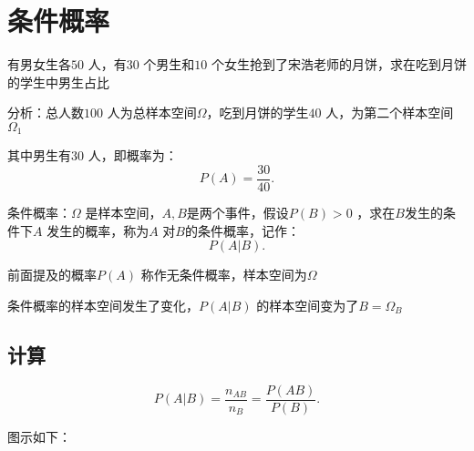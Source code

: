 \def\lecturer{SongHao}
\def\noter{THF}
\def\className{Probability Theory and Mathematical Statistics}
\def\term{III-A}




\maketitle
\tableofcontents
\section{条件概率}%
\label{sec:条件概率}
\begin{eg}
    有男女生各$50$ 人，有$30$ 个男生和$10$ 个女生抢到了宋浩老师的月饼，求在吃到月饼的学生中男生占比

    分析：总人数$100$ 人为总样本空间$\Omega$，吃到月饼的学生$40$ 人，为第二个样本空间$\Omega_1$

    其中男生有$30$ 人，即概率为：\[
        P\left( A \right) =\frac{30}{40}
    .\] 
\end{eg}
\begin{defi}
    条件概率：$\Omega$ 是样本空间，$A,B$是两个事件，假设$P\left( B \right) >0$ ，求在$B$发生的条件下$A$ 发生的概率，称为$A$ 对$B$的条件概率，记作：
    \[
        P\left( A|B \right) 
    .\] 
\end{defi}
前面提及的概率$P\left( A \right) $ 称作无条件概率，样本空间为$\Omega$ 

条件概率的样本空间发生了变化，$P\left( A|B \right) $ 的样本空间变为了$B=\Omega_B$ 

\subsection{计算}%
\label{sub:计算}
\[
    P\left( A|B \right) =\frac{n_{AB}}{n_B}=\frac{P\left( AB \right) }{P\left( B \right) }
.\] 

图示如下：
\begin{center}
\end{center}

